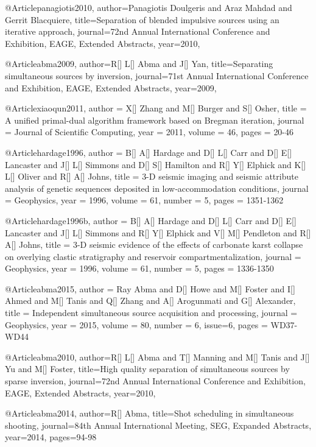 {@Article{panagiotis2010,
  author={Panagiotis Doulgeris and Araz Mahdad and Gerrit Blacquiere},
  title={Separation of blended impulsive sources using an iterative approach},
  journal={72nd Annual International Conference and Exhibition, EAGE, Extended Abstracts},
  year=2010,
}

@Article{abma2009,
  author={R[] L[] Abma and J[] Yan},
  title={Separating simultaneous sources by inversion},
  journal={71st Annual International Conference and Exhibition, EAGE, Extended Abstracts},
  year=2009,
}

@Article{xiaoqun2011,
  author = 	 {X[] Zhang and M[] Burger and S[] Osher},
  title = 	 {A unified primal-dual algorithm framework based on Bregman iteration},
  journal = 	 {Journal of Scientific Computing},
  year = 	 2011,
  volume = 	 46,
  pages = 	 {20-46}}
  
  
  
@Article{hardage1996,
  author = 	 {B[] A[] Hardage and D[] L[] Carr and D[] E[] Lancaster and J[] L[] Simmons and D[] S[] Hamilton and R[] Y[] Elphick and K[] L[] Oliver and R[] A[] Johns},
  title = 	 {3-D seismic imaging and seismic attribute analysis of genetic sequences deposited in low‐accommodation conditions},
  journal = 	 {Geophysics},
  year = 	 1996,
  volume = 	 61,
  number = 	 5,
  pages = 	 {1351-1362}}

@Article{hardage1996b,
  author = 	 {B[] A[] Hardage and D[] L[] Carr and D[] E[] Lancaster and J[] L[] Simmons and R[] Y[] Elphick and V[] M[] Pendleton and R[] A[] Johns},
  title = 	 {3-D seismic evidence of the effects of carbonate karst collapse on overlying clastic stratigraphy and reservoir compartmentalization},
  journal = 	 {Geophysics},
  year = 	 1996,
  volume = 	 61,
  number = 	 5,
  pages = 	 {1336-1350}}
 
@Article{abma2015,
  author = 	 {Ray Abma and D[] Howe and M[] Foster and I[] Ahmed and M[] Tanis and Q[] Zhang and A[] Arogunmati and G[] Alexander},
  title = 	 {Independent simultaneous source acquisition and processing},
  journal = 	 {Geophysics},
  year = 	 2015,
  volume = 	 80,
  number = 	 6,
  issue=6,
  pages = 	 {WD37-WD44}}
  
    
@Article{abma2010,
  author={R[] L[] Abma and T[] Manning and M[] Tanis and J[] Yu and M[] Foster},
  title={High quality separation of simultaneous sources by sparse inversion},
  journal={72nd Annual International Conference and Exhibition, EAGE, Extended Abstracts},
  year=2010,
}

@Article{abma2014,
  author={R[] Abma},
  title={Shot scheduling in simultaneous shooting},
  journal={84th Annual International Meeting, SEG, Expanded Abstracts},
  year=2014,
  pages={94-98}
}

}
